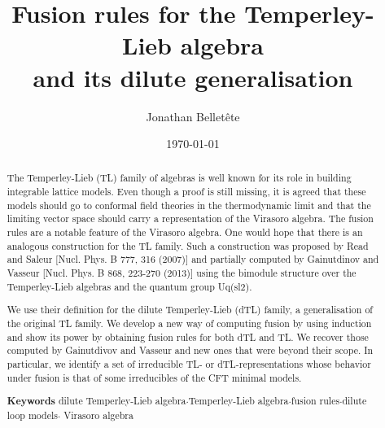 \documentclass[reqno]{amsart}
\title[Fusion rules for Temperley-Lieb families.]{Fusion rules for the Temperley-Lieb algebra\\ and its dilute generalisation}
\author[J Bellet\^ete]{Jonathan Bellet\^ete}
\date{\today}
\begin{document}
  
\begin{abstract}

The Temperley-Lieb (TL) family of algebras is well known for its role in building integrable lattice models. Even though a proof is still missing, it is agreed that these models should go to conformal field theories in the thermodynamic limit and that the limiting vector space should carry a representation of the Virasoro algebra. The fusion rules are a notable feature of the Virasoro algebra. One would hope that there is an analogous construction for the TL family. Such a construction was proposed by Read and Saleur [Nucl. Phys. B 777, 316 (2007)] and partially computed by Gainutdinov and Vasseur [Nucl. Phys. B 868, 223-270 (2013)] using the bimodule structure over the Temperley-Lieb algebras and the quantum group Uq(sl2).
 
We use their definition for the dilute Temperley-Lieb (dTL) family, a generalisation of the original TL family. We develop a new way of computing fusion by using induction and show its power by obtaining fusion rules for both dTL and TL. We recover those computed by Gainutdivov and Vasseur and new ones that were beyond their scope. In particular, we identify a set of irreducible TL- or dTL-representations whose behavior under fusion is that of some irreducibles of the CFT minimal models.

\medskip
  
\noindent\textbf{Keywords}\:\: 
dilute Temperley-Lieb algebra\;$\cdot$\;Temperley-Lieb algebra\;$\cdot$\;fusion rules\;$\cdot$\;dilute loop models\;$\cdot$\; Virasoro algebra
\end{abstract}
  
\maketitle  

\tableofcontents
	
\end{document}
